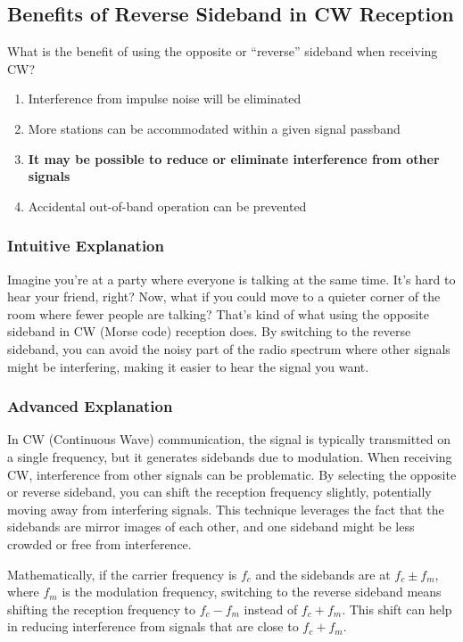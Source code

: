 \subsection{Benefits of Reverse Sideband in CW Reception}
\label{G4A02}

\begin{tcolorbox}[colback=gray!10!white,colframe=black!75!black,title=G4A02]
What is the benefit of using the opposite or “reverse” sideband when receiving CW?
\begin{enumerate}[label=\Alph*)]
    \item Interference from impulse noise will be eliminated
    \item More stations can be accommodated within a given signal passband
    \item \textbf{It may be possible to reduce or eliminate interference from other signals}
    \item Accidental out-of-band operation can be prevented
\end{enumerate}
\end{tcolorbox}

\subsubsection*{Intuitive Explanation}
Imagine you're at a party where everyone is talking at the same time. It's hard to hear your friend, right? Now, what if you could move to a quieter corner of the room where fewer people are talking? That's kind of what using the opposite sideband in CW (Morse code) reception does. By switching to the reverse sideband, you can avoid the noisy part of the radio spectrum where other signals might be interfering, making it easier to hear the signal you want.

\subsubsection*{Advanced Explanation}
In CW (Continuous Wave) communication, the signal is typically transmitted on a single frequency, but it generates sidebands due to modulation. When receiving CW, interference from other signals can be problematic. By selecting the opposite or reverse sideband, you can shift the reception frequency slightly, potentially moving away from interfering signals. This technique leverages the fact that the sidebands are mirror images of each other, and one sideband might be less crowded or free from interference.

Mathematically, if the carrier frequency is \( f_c \) and the sidebands are at \( f_c \pm f_m \), where \( f_m \) is the modulation frequency, switching to the reverse sideband means shifting the reception frequency to \( f_c - f_m \) instead of \( f_c + f_m \). This shift can help in reducing interference from signals that are close to \( f_c + f_m \).

